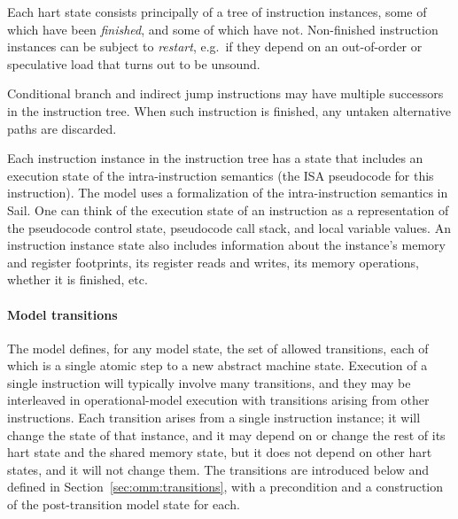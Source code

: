 Each hart state consists principally of a tree of instruction instances, some of which have been \emph{finished}, and some of which have not.
Non-finished instruction instances can be subject to \emph{restart}, e.g.~if they depend on an out-of-order or speculative load that turns out to be unsound.

Conditional branch and indirect jump instructions may have multiple successors in the instruction tree.
When such instruction is finished, any untaken alternative paths are discarded.

Each instruction instance in the instruction tree has a state that
includes an execution state of the intra-instruction semantics (the
ISA pseudocode for this instruction).
The model uses a formalization of the intra-instruction semantics in Sail.
One can think of the execution state of an instruction as a representation of the pseudocode control state, pseudocode call stack, and local variable values.
An instruction instance state also includes information about the instance's memory and register footprints, its register reads and writes, its memory operations, whether it is finished, etc.

\paragraph{Model transitions}
The model defines, for any model state, the set of allowed transitions, each of which is a single atomic step to a new abstract machine state.
Execution of a single instruction will typically involve many
transitions, and they may be interleaved in operational-model
execution with transitions arising from other instructions. 
Each transition arises from a single instruction instance; it will
change the state of that instance, and it may depend on or change the
rest of its hart state and the shared memory state, but it does not depend on other hart states, and it will not change them.
The transitions are introduced below and defined in Section~\ref{sec:omm:transitions}, with a precondition and a construction of the post-transition model state for each.

